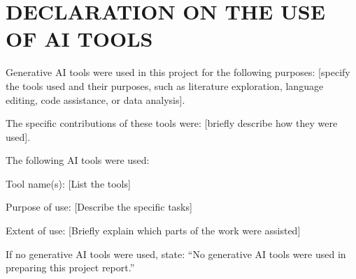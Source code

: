 \chapter*{\uppercase{DECLARATION ON THE USE OF AI TOOLS}}
Generative AI tools were used in this project for the following purposes: [specify the tools used and their purposes, such as literature exploration, language editing, code assistance, or data analysis].

The specific contributions of these tools were: [briefly describe how they were used].


The following AI tools were used:

Tool name(s): [List the tools]

Purpose of use: [Describe the specific tasks]

Extent of use: [Briefly explain which parts of the work were assisted]

If no generative AI tools were used, state: “No generative AI tools were used in preparing this project report.”
